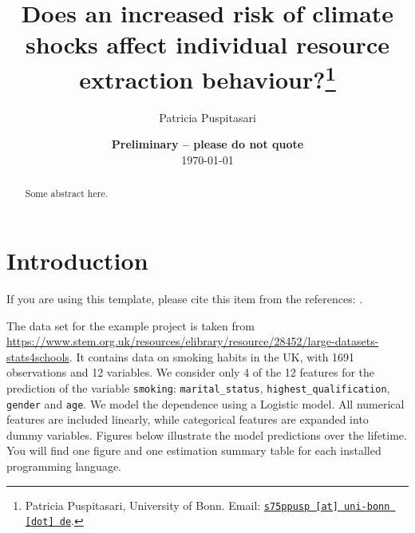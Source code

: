 \documentclass[11pt, a4paper, leqno]{article}
\begin{document}
\title{Does an increased risk of climate shocks affect individual resource extraction behaviour?\thanks{Patricia Puspitasari, University of Bonn. Email: \href{mailto:s75ppusp@uni-bonn.de}{\nolinkurl{s75ppusp [at] uni-bonn [dot] de}}.}}

\author{Patricia Puspitasari}

\date{
    {\bf Preliminary -- please do not quote}
    \\[1ex]
    \today
}

\maketitle


\begin{abstract}
    Some abstract here.
\end{abstract}

\clearpage


\section{Introduction} %
\label{sec:introduction}

If you are using this template, please cite this item from the references:
\citet{GaudeckerEconProjectTemplates}.

The data set for the example project is taken from
\url{https://www.stem.org.uk/resources/elibrary/resource/28452/large-datasets-stats4schools}.
It contains data on smoking habits in the UK, with 1691 observations and 12 variables.
We consider only 4 of the 12 features for the prediction of the variable
\texttt{smoking}: \texttt{marital\_status}, \texttt{highest\_qualification},
\texttt{gender} and \texttt{age}. We model the dependence using a Logistic model. All
numerical features are included linearly, while categorical features are expanded into
dummy variables. Figures below illustrate the model predictions over the lifetime. You
will find one figure and one estimation summary table for each installed programming
language.









\printbibliography
{}



\end{document}

